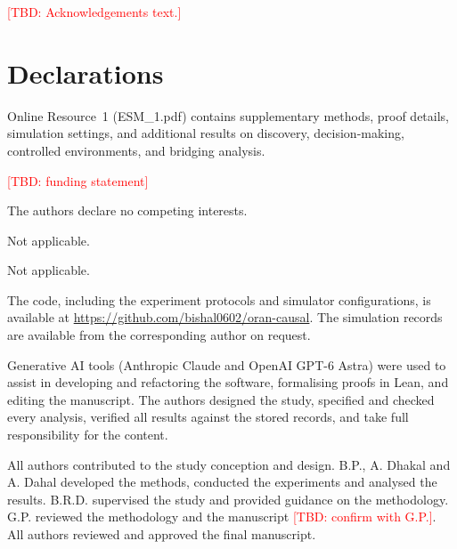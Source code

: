 \documentclass[pdflatex,sn-mathphys-num]{sn-jnl}%
\newcommand{\tbd}[1]{\textcolor{red}{[TBD: #1]}}
\theoremstyle{thmstyleone}%
\theoremstyle{thmstyletwo}%
\theoremstyle{thmstylethree}%
\begin{document}

\maketitle










\backmatter


\tbd{Acknowledgements text.}

\section*{Declarations}


Online Resource~1 (ESM\_1.pdf) contains supplementary methods, proof details, simulation settings, and additional results on discovery, decision-making, controlled environments, and bridging analysis.


\tbd{funding statement}


The authors declare no competing interests.


Not applicable.


Not applicable.


The code, including the experiment protocols and simulator configurations, is available at \url{https://github.com/bishal0602/oran-causal}. The simulation records are available from the corresponding author on request.


Generative AI tools (Anthropic Claude and OpenAI GPT-6 Astra) were used to assist in developing and refactoring the software, formalising proofs in Lean, and editing the manuscript. The authors designed the study, specified and checked every analysis, verified all results against the stored records, and take full responsibility for the content.


All authors contributed to the study conception and design. B.P., A. Dhakal and A. Dahal
developed the methods, conducted the experiments and analysed the results. B.R.D. supervised
the study and provided guidance on the methodology. G.P. reviewed the methodology and the manuscript
\tbd{confirm with G.P.}. All authors reviewed and approved the final manuscript.

\clearpage


\end{document}

